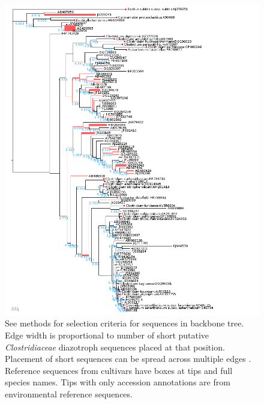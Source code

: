 \begin{figure}[h!]
  \centering
    \includegraphics[width=1.0\textwidth]{figures/clost.tree/clost_tree.png}
  \caption{See methods for selection criteria for sequences in backbone tree. Edge width is proportional to number of short putative \textit{Clostridiaceae} diazotroph sequences placed at that position. Placement of short sequences can be spread across multiple edges \cite{Matsen_2010}. Reference sequences from cultivars have boxes at tips and full species names. Tips with only accession annotations are from environmental reference sequences.}
  \label{fig:clost_tree}
\end{figure}
